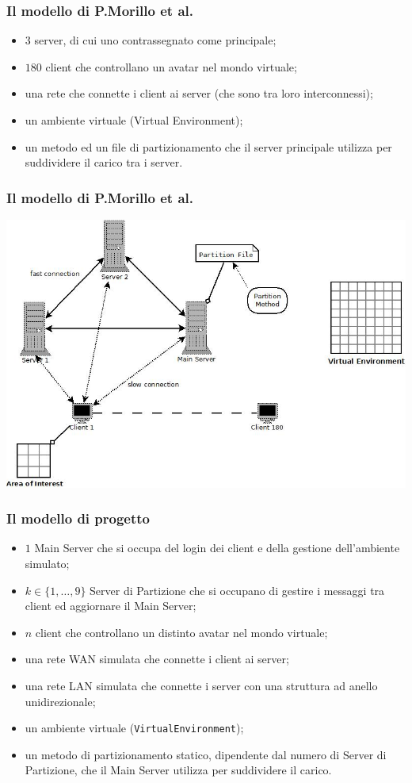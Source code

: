 \begin{frame}
\frametitle{Il modello di P.Morillo et al.}
\begin{itemize}[<+->]
\item
$3$ server, di cui uno contrassegnato come principale;
\item
$180$ client che controllano un avatar nel mondo virtuale;
\item
una rete che connette i client ai server (che sono tra loro interconnessi);
\item
un ambiente virtuale (Virtual Environment);
\item
un metodo ed un file di partizionamento che il server principale utilizza per
suddividere il carico tra i server.
\end{itemize}
\end{frame}

\begin{frame}
\frametitle{Il modello di P.Morillo et al.}
\begin{center}
\includegraphics[scale=.45]{schema.jpeg}
\end{center}
\end{frame}


\begin{frame}
\frametitle{Il modello di progetto}
\begin{itemize}[<+->]
\item
$1$ Main Server che si occupa del login dei client e della gestione
dell'ambiente simulato;
\item
$k \in \{1, \ldots, 9\}$ Server di Partizione che si occupano di gestire i
messaggi tra client ed aggiornare il Main Server;
\item
$n$ client che controllano un distinto avatar nel mondo virtuale;
\item
una rete WAN simulata che connette i client ai server;
\item
una rete LAN simulata che connette i server con una struttura ad anello
unidirezionale;
\item
un ambiente virtuale (\texttt{VirtualEnvironment});
\item
un metodo di partizionamento statico, dipendente dal numero di Server di
Partizione, che il Main Server utilizza per suddividere il carico.
\end{itemize}
\end{frame}

